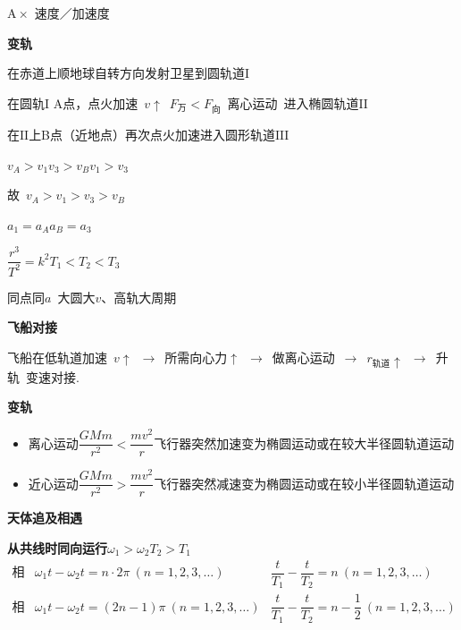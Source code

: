 A\,$\times$\ 速度／加速度

\textbf{变轨}


在赤道上顺地球自转方向发射卫星到圆轨道$\mathrm{I}$

在圆轨$\mathrm{I}$ A点，点火加速\ $v\uparrow$\ $F_{\text{万}}<F_{\text{向}}$\ 离心运动\ 进入椭圆轨道$\mathrm{II}$

在$\mathrm{II}$上B点（近地点）再次点火加速进入圆形轨道$\mathrm{III}$%

$v_A>v_1$\qquad $v_3>v_B$\qquad $v_1>v_3$

故\ $v_A>v_1>v_3>v_B$

$a_1=a_A$\qquad $a_B=a_3$

$\dfrac{r^{3}}{T^{2}}=k^{2}$\qquad $T_1<T_2<T_3$%

同点同$a$\ 大圆大$v$、高轨大周期

\textbf{飞船对接}

飞船在低轨道加速\ $v\uparrow$\ $\to$\ 所需向心力$\uparrow$\ $\to$\ 做离心运动\ $\to$\ $r_{\text{轨道}}\uparrow$\ $\to$\ 升轨\ 变速对接.

\textbf{变轨}
\begin{itemize}
\item 离心运动\quad $\dfrac{GMm}{r^{2}}<\dfrac{mv^{2}}{r}$\quad 飞行器突然加速\quad 变为椭圆运动或在较大半径圆轨道运动
\item 近心运动\quad $\dfrac{GMm}{r^{2}}>\dfrac{mv^{2}}{r}$\quad 飞行器突然减速\quad 变为椭圆运动或在较小半径圆轨道运动
\end{itemize}
\textbf{天体追及相遇}

\textbf{从共线时同向运行}\quad $\omega_1>\omega_2$\quad $T_2>T_1$
\[
\begin{array}{lll}
\text{相距最近} & \omega_1t-\omega_2t=n\cdot2\pi\ (n=1,2,3,\ldots) & \dfrac{t}{T_1}-\dfrac{t}{T_2}=n\ (n=1,2,3,\ldots)\\[10pt]
\text{相距最远} & \omega_1t-\omega_2t=(2n-1)\pi\ (n=1,2,3,\ldots) & \dfrac{t}{T_1}-\dfrac{t}{T_2}=n-\dfrac{1}{2}\ (n=1,2,3,\ldots)
\end{array}
\]

